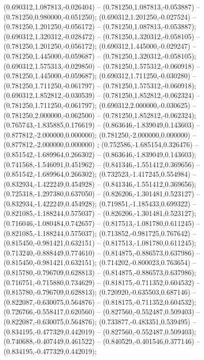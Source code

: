 (0.690312,1.087813,-0.026404) -- (0.781250,1.087813,-0.053887) -- (0.781250,0.980000,-0.051250);
 (0.690312,1.201250,-0.027524) -- (0.781250,1.201250,-0.056172) -- (0.781250,1.087813,-0.053887);
 (0.690312,1.320312,-0.028472) -- (0.781250,1.320312,-0.058105) -- (0.781250,1.201250,-0.056172);
 (0.690312,1.445000,-0.029247) -- (0.781250,1.445000,-0.059687) -- (0.781250,1.320312,-0.058105);
 (0.690312,1.575313,-0.029850) -- (0.781250,1.575312,-0.060918) -- (0.781250,1.445000,-0.059687);
 (0.690312,1.711250,-0.030280) -- (0.781250,1.711250,-0.061797) -- (0.781250,1.575312,-0.060918);
 (0.690312,1.852812,-0.030539) -- (0.781250,1.852812,-0.062324) -- (0.781250,1.711250,-0.061797);
 (0.690312,2.000000,-0.030625) -- (0.781250,2.000000,-0.062500) -- (0.781250,1.852812,-0.062324);
 (0.765743,-1.835885,0.176619) -- (0.863646,-1.839049,0.143603) -- (0.877812,-2.000000,0.000000);
 (0.781250,-2.000000,0.000000) -- (0.877812,-2.000000,0.000000) ;
 (0.752586,-1.685154,0.326476) -- (0.851542,-1.689964,0.266302) -- (0.863646,-1.839049,0.143603);
 (0.741568,-1.546091,0.451962) -- (0.841346,-1.551412,0.369656) -- (0.851542,-1.689964,0.266302);
 (0.732523,-1.417245,0.554984) -- (0.832934,-1.422249,0.454928) -- (0.841346,-1.551412,0.369656);
 (0.725318,-1.297380,0.637050) -- (0.826206,-1.301481,0.523127) -- (0.832934,-1.422249,0.454928);
 (0.719851,-1.185433,0.699322) -- (0.821085,-1.188244,0.575037) -- (0.826206,-1.301481,0.523127);
 (0.716046,-1.080484,0.742657) -- (0.817513,-1.081780,0.611245) -- (0.821085,-1.188244,0.575037);
 (0.713852,-0.981725,0.767642) -- (0.815450,-0.981421,0.632151) -- (0.817513,-1.081780,0.611245);
 (0.713240,-0.888449,0.774610) -- (0.814875,-0.886573,0.637986) -- (0.815450,-0.981421,0.632151);
 (0.714202,-0.800023,0.763654) -- (0.815780,-0.796709,0.628813) -- (0.814875,-0.886573,0.637986);
 (0.716751,-0.715880,0.734629) -- (0.818175,-0.711352,0.604532) -- (0.815780,-0.796709,0.628813);
 (0.720920,-0.635503,0.687146) -- (0.822087,-0.630075,0.564876) -- (0.818175,-0.711352,0.604532);
 (0.726766,-0.558417,0.620560) -- (0.827560,-0.552487,0.509403) -- (0.822087,-0.630075,0.564876);
 (0.733877,-0.483351,0.539495) -- (0.834195,-0.477329,0.442019) -- (0.827560,-0.552487,0.509403);
 (0.740688,-0.407449,0.461522) -- (0.840529,-0.401546,0.377146) -- (0.834195,-0.477329,0.442019);
